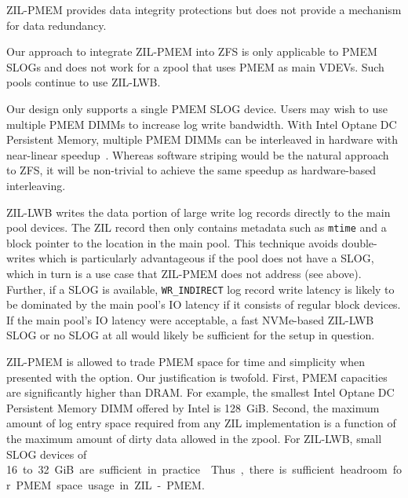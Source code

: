 \documentclass[12pt,a4paper,twoside]{book}
\begin{document}
ZIL-PMEM provides data integrity protections but does not provide a mechanism for data redundancy.

Our approach to integrate ZIL-PMEM into ZFS is only applicable to PMEM SLOGs and does not work for a zpool that uses PMEM as main VDEVs.
Such pools continue to use ZIL-LWB.

Our design only supports a single PMEM SLOG device.
Users may wish to use multiple PMEM DIMMs to increase log write bandwidth.
With Intel Optane DC Persistent Memory, multiple PMEM DIMMs can be interleaved in hardware with near-linear speedup~\cite{yangEmpiricalGuideBehavior2020}.
Whereas software striping would be the natural approach to ZFS, it will be non-trivial to achieve the same speedup as hardware-based interleaving.

ZIL-LWB writes the data portion of large write log records directly to the main pool devices.
The ZIL record then only contains metadata such as \lstinline{mtime} and a block pointer to the location in the main pool.
This technique avoids double-writes which is particularly advantageous if the pool does not have a SLOG, which in turn is a use case that ZIL-PMEM does not address (see above).
Further, if a SLOG is available, \lstinline{WR_INDIRECT} log record write latency is likely to be dominated by the main pool's IO latency if it consists of regular block devices.
If the main pool's IO latency were acceptable, a fast NVMe-based ZIL-LWB SLOG or no SLOG at all would likely be sufficient for the setup in question.

ZIL-PMEM is allowed to trade PMEM space for time and simplicity when presented with the option.
Our justification is twofold.
First, PMEM capacities are significantly higher than DRAM.
For example, the smallest Intel Optane DC Persistent Memory DIMM offered by Intel is 128~GiB.
Second, the maximum amount of log entry space required from any ZIL implementation is a function of the maximum amount of dirty data allowed in the zpool.
For ZIL-LWB, small SLOG devices of \SI{16} to 32~GiB are sufficient in practice \cite{OpenZFSDocsWorkloadTuningSynchronousIO}.
Thus, there is sufficient headroom for PMEM space usage in ZIL-PMEM.
\end{document}
